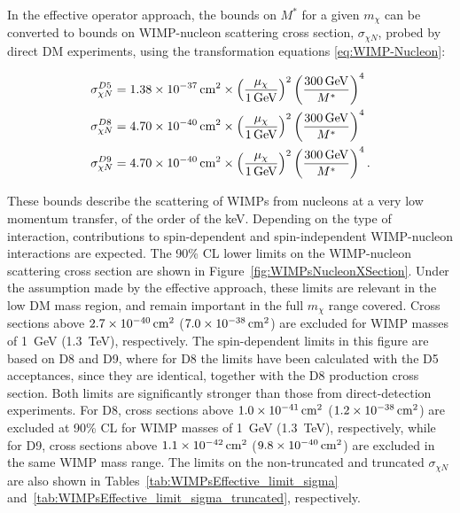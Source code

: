 In the effective operator approach, the bounds on $M^{\ast}$ for a given $m_{\chi}$ can be converted to bounds on WIMP-nucleon scattering cross section, $\sigma_{\chi N}$, probed by direct DM experiments, using the transformation equations \ref{eq:WIMP-Nucleon}:

\begin{equation}
\begin{split}
\sigma^{D5}_{\chi N} &= 1.38 \times \unit[10^{-37}]{cm^2} \times \left(\frac{\mu_{\chi}}{\unit[1]{GeV}}\right)^2\left(\frac{\unit[300]{GeV}}{M^{\ast}}\right)^4 \\
\sigma^{D8}_{\chi N} &= 4.70 \times \unit[10^{-40}]{cm^2} \times \left(\frac{\mu_{\chi}}{\unit[1]{GeV}}\right)^2\left(\frac{\unit[300]{GeV}}{M^{\ast}}\right)^4 \\
\sigma^{D9}_{\chi N} &= 4.70 \times \unit[10^{-40}]{cm^2} \times \left(\frac{\mu_{\chi}}{\unit[1]{GeV}}\right)^2\left(\frac{\unit[300]{GeV}}{M^{\ast}}\right)^4. \\
\end{split}
\label{eq:WIMP-Nucleon_2}
\end{equation}

These bounds describe the scattering of WIMPs from nucleons at a very low momentum transfer, of the order of the keV.
Depending on the type of interaction, contributions to spin-dependent and spin-independent WIMP-nucleon interactions are expected.
The 90\% CL lower limits on the WIMP-nucleon scattering cross section are shown in Figure~\ref{fig:WIMPsNucleonXSection}.
Under the assumption made by the effective approach, these limits are relevant in the low DM mass region, and remain important in the full $m_{\chi}$ range covered.
Cross sections above $\unit[2.7\times10^{-40}]{cm^{2}}$ ($\unit[7.0\times10^{-38}]{cm^{2}}$) are excluded for WIMP masses of 1~GeV (1.3~TeV), respectively.
The spin-dependent limits in this figure are based on D8 and D9, where for D8 the limits have been calculated with the D5 acceptances, since they are identical, together with the D8 production cross section.
Both limits are significantly stronger than those from direct-detection experiments.
For D8, cross sections above $\unit[1.0\times10^{-41}]{cm^{2}}$ ($\unit[1.2\times10^{-38}]{cm^{2}}$) are excluded at 90\% CL for WIMP masses of 1~GeV (1.3~TeV), respectively, while for D9, cross sections above $\unit[1.1\times10^{-42}]{cm^{2}}$ ($\unit[9.8\times10^{-40}]{cm^{2}}$) are excluded in the same WIMP mass range.
The limits on the non-truncated and truncated $\sigma_{\chi N}$ are also shown in Tables~\ref{tab:WIMPsEffective_limit_sigma} and~\ref{tab:WIMPsEffective_limit_sigma_truncated}, respectively.


